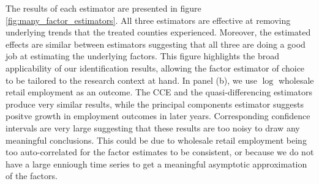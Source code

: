 \documentclass[12pt]{article}
\begin{document}
The results of each estimator are presented in figure \ref{fig:many_factor_estimators}. All three estimators are effective at removing underlying trends that the treated counties experienced. Moreover, the estimated effects are similar between estimators suggesting that all three are doing a good job at estimating the underlying factors. This figure highlights the broad applicability of our identification results, allowing the factor estimator of choice to be tailored to the research context at hand. In panel (b), we use $\log$ wholesale retail employment as an outcome. The CCE and the quasi-differencing estimators produce very similar results, while the principal components estimator suggests positve growth in employment outcomes in later years. Corresponding confidence intervals are very large suggesting that these results are too noisy to draw any meaningful conclusions. This could be due to wholesale retail employment being too auto-correlated for the factor estimates to be consistent, or because we do not have a large enniough time series to get a meaningful asymptotic approximation of the factors.
\end{document}
